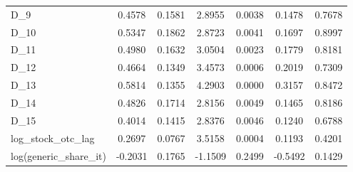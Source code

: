 \documentclass[a4paper,11pt,uplatex]{jsarticle}
\theoremstyle{definition}
\begin{document}
\begin{appendices}
\begin{table}[ht]
\begin{tabular}{lcccccc}
        D\_9 & 0.4578 & 0.1581 & 2.8955 & 0.0038 & 0.1478 & 0.7678 \\
        D\_10 & 0.5347 & 0.1862 & 2.8723 & 0.0041 & 0.1697 & 0.8997 \\
        D\_11 & 0.4980 & 0.1632 & 3.0504 & 0.0023 & 0.1779 & 0.8181 \\
        D\_12 & 0.4664 & 0.1349 & 3.4573 & 0.0006 & 0.2019 & 0.7309 \\
        D\_13 & 0.5814 & 0.1355 & 4.2903 & 0.0000 & 0.3157 & 0.8472 \\
        D\_14 & 0.4826 & 0.1714 & 2.8156 & 0.0049 & 0.1465 & 0.8186 \\
        D\_15 & 0.4014 & 0.1415 & 2.8376 & 0.0046 & 0.1240 & 0.6788 \\
        log\_stock\_otc\_lag & 0.2697 & 0.0767 & 3.5158 & 0.0004 & 0.1193 & 0.4201 \\
        log(generic\_share\_it) & -0.2031 & 0.1765 & -1.1509 & 0.2499 & -0.5492 & 0.1429 \\
        \hline
        \end{tabular}
        \end{table}
        

\end{appendices}
\end{document}
